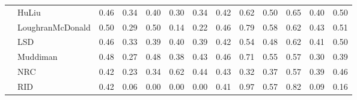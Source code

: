 \begin{tabularx}{\textwidth}{lXXrrrrrrrrrrr}
 & \multicolumn{2}{l}{ HuLiu }& \cellcolor[gray]{0.77} 0.46& \cellcolor[gray]{0.83} 0.34& \cellcolor[gray]{0.80} 0.40& \cellcolor[gray]{0.85} 0.30& \cellcolor[gray]{0.83} 0.34& \cellcolor[gray]{0.79} 0.42& \cellcolor[gray]{0.69} 0.62& \cellcolor[gray]{0.75} 0.50& \cellcolor[gray]{0.68} 0.65& \cellcolor[gray]{0.80} 0.40& \cellcolor[gray]{0.75} 0.50\\

 & \multicolumn{2}{l}{ LoughranMcDonald }& \cellcolor[gray]{0.75} 0.50& \cellcolor[gray]{0.85} 0.29& \cellcolor[gray]{0.75} 0.50& \cellcolor[gray]{0.93} 0.14& \cellcolor[gray]{0.89} 0.22& \cellcolor[gray]{0.77} 0.46& \cellcolor[gray]{0.60} 0.79& \cellcolor[gray]{0.71} 0.58& \cellcolor[gray]{0.69} 0.62& \cellcolor[gray]{0.78} 0.43& \cellcolor[gray]{0.74} 0.51\\

 & \multicolumn{2}{l}{ LSD }& \cellcolor[gray]{0.77} 0.46& \cellcolor[gray]{0.84} 0.33& \cellcolor[gray]{0.80} 0.39& \cellcolor[gray]{0.80} 0.40& \cellcolor[gray]{0.80} 0.39& \cellcolor[gray]{0.79} 0.42& \cellcolor[gray]{0.73} 0.54& \cellcolor[gray]{0.76} 0.48& \cellcolor[gray]{0.69} 0.62& \cellcolor[gray]{0.79} 0.41& \cellcolor[gray]{0.75} 0.50\\

 & \multicolumn{2}{l}{ Muddiman }& \cellcolor[gray]{0.76} 0.48& \cellcolor[gray]{0.87} 0.27& \cellcolor[gray]{0.76} 0.48& \cellcolor[gray]{0.81} 0.38& \cellcolor[gray]{0.79} 0.43& \cellcolor[gray]{0.77} 0.46& \cellcolor[gray]{0.65} 0.71& \cellcolor[gray]{0.72} 0.55& \cellcolor[gray]{0.72} 0.57& \cellcolor[gray]{0.85} 0.30& \cellcolor[gray]{0.80} 0.39\\

 & \multicolumn{2}{l}{ NRC }& \cellcolor[gray]{0.79} 0.42& \cellcolor[gray]{0.89} 0.23& \cellcolor[gray]{0.83} 0.34& \cellcolor[gray]{0.69} 0.62& \cellcolor[gray]{0.78} 0.44& \cellcolor[gray]{0.79} 0.43& \cellcolor[gray]{0.84} 0.32& \cellcolor[gray]{0.82} 0.37& \cellcolor[gray]{0.72} 0.57& \cellcolor[gray]{0.80} 0.39& \cellcolor[gray]{0.77} 0.46\\

 & \multicolumn{2}{l}{ RID }& \cellcolor[gray]{0.79} 0.42& \cellcolor[gray]{0.97} 0.06& \cellcolor[gray]{1.00} 0.00& \cellcolor[gray]{1.00} 0.00& \cellcolor[gray]{1.00} 0.00& \cellcolor[gray]{0.80} 0.41& \cellcolor[gray]{0.51} 0.97& \cellcolor[gray]{0.71} 0.57& \cellcolor[gray]{0.59} 0.82& \cellcolor[gray]{0.95} 0.09& \cellcolor[gray]{0.92} 0.16\\


\bottomrule
\end{tabularx}

